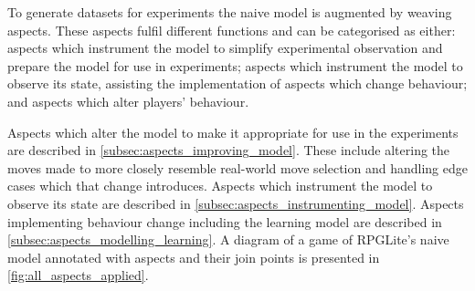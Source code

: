




To generate datasets for experiments the naive model is augmented by weaving
aspects. These aspects fulfil different functions and can be categorised as
either: aspects which instrument the model to simplify experimental observation
and prepare the model for use in experiments; aspects which instrument the model
to observe its state, assisting the implementation of aspects which change
behaviour; and aspects which alter players' behaviour.

Aspects which alter the model to make it appropriate for use in the experiments
are described in \cref{subsec:aspects_improving_model}. These include altering
the moves made to more closely resemble real-world move selection and handling
edge cases which that change introduces. Aspects which instrument the model to
observe its state are described in \cref{subsec:aspects_instrumenting_model}.
Aspects implementing behaviour change including the learning model are described
in \cref{subsec:aspects_modelling_learning}. A diagram of a game of RPGLite's
naive model annotated with aspects and their join points is presented in
\cref{fig:all_aspects_applied}.

